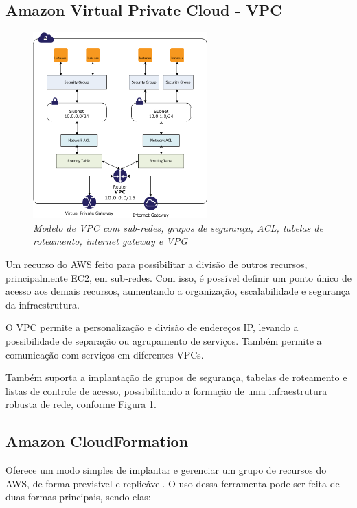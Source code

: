 \documentclass[tg]{mdtufsm}
\begin{document}
\subsection{Amazon Virtual Private Cloud - VPC}

\begin{figure}
	\centering
	\includegraphics[width=0.6\textwidth]{vpc}
	\caption{\emph{Modelo de VPC com sub-redes, grupos de segurança, ACL, tabelas de roteamento, internet gateway e VPG \cite{vpcimg}}}
	\label{fig:vpcImg}
\end{figure}

Um recurso do AWS feito para possibilitar a divisão de outros recursos, principalmente EC2, em sub-redes. Com isso, é possível definir um ponto único de acesso aos demais recursos, aumentando a organização, escalabilidade e segurança da infraestrutura.

O VPC permite a personalização e divisão de endereços IP, levando a possibilidade de separação ou agrupamento de serviços. Também permite a comunicação com serviços em diferentes VPCs.

Também suporta a implantação de grupos de segurança, tabelas de roteamento e listas de controle de acesso, possibilitando a formação de uma infraestrutura robusta de rede, conforme Figura \ref{fig:vpcImg}.

\subsection{Amazon CloudFormation}

Oferece um modo simples de implantar e gerenciar um grupo de recursos do AWS, de forma previsível e replicável. O uso dessa ferramenta pode ser feita de duas formas principais, sendo elas:
\end{document}
